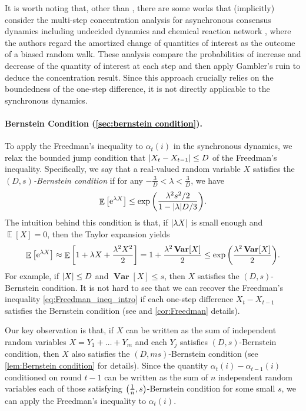 \documentclass[letterpaper,11pt]{article}
\DeclareMathOperator*{\E}{\mathbb{E}}
\DeclareMathOperator*{\Var}{\mathbf{Var}}
\newcommand{\e}{\mathrm{e}}
\begin{document}
It is worth noting that, other than \cite{async_3-majority_soda25}, there are some works that (implicitly) consider the multi-step concentration analysis for asynchronous consensus dynamics including undecided dynamics \cite{fast_convergence_undecided} and chemical reaction network \cite{Condon2020-CRN}, where the authors regard the amortized change of quantities of interest as the outcome of a biased random walk.
These analysis compare the probabilities of increase and decrease of the quantity of interest at each step and then apply Gambler's ruin to deduce the concentration result.
Since this approach crucially relies on the boundedness of the one-step difference, it is not directly applicable to the synchronous dynamics.

\paragraph*{Bernstein Condition (\cref{sec:bernstein condition}).}

To apply the Freedman's inequality to $\alpha_t(i)$ in the synchronous dynamics,
  we relax the bounded jump condition that $\abs{X_t - X_{t-1}} \le D$ of the Freedman's inequality.
Specifically, we say that a real-valued random variable $X$ satisfies the \emph{$(D,s)$-Bernstein condition} if for any $-\frac{3}{D}<\lambda<\frac{3}{D}$, we have
\[
  \E\qty[\e^{\lambda X}] \le \exp\qty(\frac{\lambda^2 s^2/2}{1-\abs{\lambda} D/3}).
\]
The intuition behind this condition is that, if $\abs{\lambda X}$ is small enough and $\E[X]=0$, then the Taylor expansion yields
\begin{align*}
  \E\qty[\e^{\lambda X}] \approx \E\qty[ 1 + \lambda X + \frac{\lambda^2 X^2}{2} ] = 1 + \frac{\lambda^2 \Var[X]}{2} \le \exp\qty( \frac{\lambda^2 \Var[X]}{2} ).
\end{align*}
For example, if $\abs{X}\le D$ and $\Var[X]\le s$, then $X$ satisfies the $(D,s)$-Bernstein condition.
It is not hard to see that we can recover the Freedman's inequality \cref{eq:Freedman_ineq_intro} if each one-step difference $X_t - X_{t-1}$ satisfies the Bernstein condition (see \cite{FGL15} and \cref{cor:Freedman} details).

Our key observation is that, if $X$ can be written as the sum of independent random variables $X=Y_1+\dots+Y_m$ and each $Y_j$ satisfies $(D,s)$-Bernstein condition, then $X$ also satisfies the $(D,ms)$-Bernstein condition (see \cref{lem:Bernstein condition} for details).
Since the quantity $\alpha_t(i) - \alpha_{t-1}(i)$ conditioned on round $t-1$
can be written as the sum of $n$ independent random variables each of those satisfying $\qty(\frac{1}{n},s)$-Bernstein condition for some small $s$, we can apply the Freedman's inequality to $\alpha_t(i)$.
\end{document}
